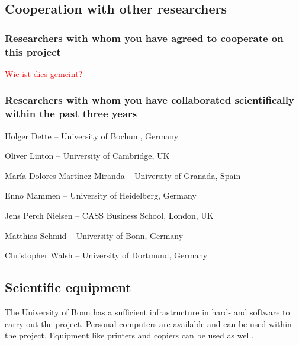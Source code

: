 \documentclass[a4paper,12pt]{article}
\begin{document}
\subsection{Cooperation with other researchers}

\subsubsection{Researchers with whom you have agreed to cooperate on this project}

\textcolor{red}{Wie ist dies gemeint?}

\subsubsection{Researchers with whom you have collaborated scientifically within the past three years}

\noindent Holger Dette -- University of Bochum, Germany 

\noindent Oliver Linton -- University of Cambridge, UK

\noindent Mar\'ia Dolores Mart\'inez-Miranda -- University of Granada, Spain

\noindent Enno Mammen -- University of Heidelberg, Germany

\noindent Jens Perch Nielsen -- CASS Business School, London, UK 

\noindent Matthias Schmid -- University of Bonn, Germany

\noindent Christopher Walsh -- University of Dortmund, Germany 


\subsection{Scientific equipment}
The University of Bonn has a sufficient infrastructure in hard- and software to carry out the project. Personal computers are available and can be used within the project. Equipment like printers and copiers can be used as well.


\end{document}
